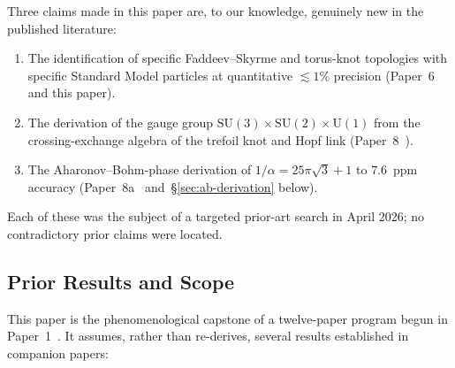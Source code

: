 \documentclass[11pt]{article}
\begin{document}
Three claims made in this paper are, to our knowledge, genuinely
new in the published literature:
\begin{enumerate}
  \item The identification of specific Faddeev--Skyrme and
        torus-knot topologies with specific Standard Model
        particles at quantitative $\lesssim 1\%$ precision
        (Paper~6~\cite{NWT6} and this paper).
  \item The derivation of the gauge group
        $\text{SU}(3) \times \text{SU}(2) \times \text{U}(1)$ from
        the crossing-exchange algebra of the trefoil knot and Hopf
        link (Paper~8~\cite{NWT8}).
  \item The Aharonov--Bohm-phase derivation of
        $1/\alpha = 25\pi\sqrt{3}+1$ to $7.6$~ppm accuracy
        (Paper~8a~\cite{NWT8a} and~\S\ref{sec:ab-derivation} below).
\end{enumerate}
Each of these was the subject of a targeted prior-art search in
April 2026; no contradictory prior claims were located.

\subsection{Prior Results and Scope}
\label{sec:scope}

This paper is the phenomenological capstone of a twelve-paper
program begun in Paper~1~\cite{NWT1}.  It assumes, rather than
re-derives, several results established in companion papers:
\end{document}
